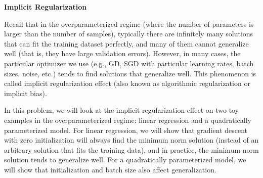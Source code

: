 \item {} {\bf Implicit Regularization}

Recall that in the overparameterized regime (where the number of parameters is larger than the number of samples), typically there are infinitely many solutions that can fit the training dataset perfectly, and many of them cannot generalize well (that is, they have large validation errors). However, in many cases, the particular optimizer we use (e.g., GD, SGD with particular learning rates, batch sizes, noise, etc.) tends to find solutions that generalize well. This phenomenon is called implicit regularization effect (also known as algorithmic regularization or implicit bias). 

In this problem, we will look at the implicit regularization effect on two toy examples in the overparameterized regime: linear regression and a quadratically parameterized model. For linear regression, we will show that gradient descent with zero initialization will always find the minimum norm solution (instead of an arbitrary solution that fits the training data), and in practice, the minimum norm solution tends to generalize well. For a quadratically parameterized model, we will show that initialization and batch size also affect generalization.

\begin{enumerate}
    
    	\ifnum{} {
	
    	}\fi
    
    
    
    \ifnum{} {
    	
    	}\fi
    
    
	\ifnum{} {
		
		}\fi
	
	
	\ifnum{} {
		
	}\fi

	
	\ifnum{} {
		
	}\fi

	
	\ifnum{} {
		
	}\fi

	
	\ifnum{} {
		
	}\fi
\end{enumerate}
